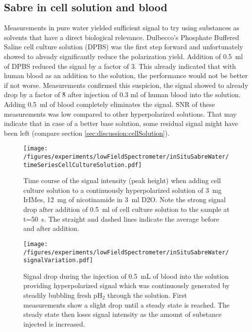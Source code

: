     \subsection{Sabre in cell solution and blood}
    Measurements in pure water yielded sufficient signal to try using substances as solvents that have a direct biological relevance. Dulbecco's Phosphate Buffered Saline cell culture solution (DPBS) was the first step forward and unfortunately showed to already significantly reduce the polarization yield. Addition of \SI{0.5}{\milli\litre} of DPBS reduced the signal by a factor of 3. This already indicated that with human blood as an addition to the solution, the performance would not be better if not worse. Measurements confirmed this suspicion, the signal showed to already drop by a factor of \~8 after injection of 0.3 ml of human blood into the solution. Adding \SI{0.5}{\milli\litre} of blood completely eliminates the signal. SNR of these measurements was low compared to other hyperpolarized solutions. That may indicate that in case of a better base solution, some residual signal might have been left (compare section \ref{sec:discussion:cellSolution}).
        \begin{figure}
            \texttt{[image: /figures/experiments/lowFieldSpectrometer/inSituSabreWater/timeSeriesCellCultureSolution.pdf]}
            \caption[Cell culture solution addition to hyperpolarized signal]{Time course of the signal intensity (peak height) when adding cell culture solution to a continuously hyperpolarized solution of \SI{3}{\milli\gram} IrIMes, \SI{12}{\milli\gram} of nicotinamide in \SI{3}{\milli\litre} D2O. Note the strong signal drop after addition of \SI{0.5}{\milli\litre} of cell culture solution to the sample at t=\SI{50}{\second}. The straight and dashed lines indicate the average before and after addition.}
            \label{chap:MaterialsAndMethods:bloodInjection}
        \end{figure}
        \begin{figure}
            \centering
            \texttt{[image: /figures/experiments/lowFieldSpectrometer/inSituSabreWater/signalVariation.pdf]}
            \caption[Blood addition to hyperpolarized signal]{Signal drop during the injection of \SI{0.5}{\milli\liter} of blood into the solution providing hyperpolarized signal which was continuously generated by steadily bubbling fresh pH$_2$ through the solution. First measurements show a slight drop until a steady state is reached. The steady state then loses signal intensity as the amount of substance injected is increased.}
            \label{chap:MaterialsAndMethods:bloodInjection2}
        \end{figure}
